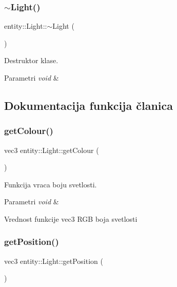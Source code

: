 \subsubsection{\texorpdfstring{$\sim$\+Light()}{~Light()}}
{\footnotesize\ttfamily entity\+::\+Light\+::$\sim$\+Light (\begin{DoxyParamCaption}{ }\end{DoxyParamCaption})}



Destruktor klase. 


\begin{DoxyParams}{Parametri}
{\em void} & \\
\hline
\end{DoxyParams}


\subsection{Dokumentacija funkcija članica}
\mbox{\label{classentity_1_1Light_a84799bc558b5c06758cd5e343243df4b}} 
\subsubsection{\texorpdfstring{get\+Colour()}{getColour()}}
{\footnotesize\ttfamily vec3 entity\+::\+Light\+::get\+Colour (\begin{DoxyParamCaption}{ }\end{DoxyParamCaption})}



Funkcija vraca boju svetlosti. 


\begin{DoxyParams}{Parametri}
{\em void} & \\
\hline
\end{DoxyParams}
\begin{DoxyReturn}{Vrednost funkcije}
vec3 R\+GB boja svetlosti 
\end{DoxyReturn}
\mbox{\label{classentity_1_1Light_aca0644bed009e20c672224ed0c92546e}} 
\subsubsection{\texorpdfstring{get\+Position()}{getPosition()}}
{\footnotesize\ttfamily vec3 entity\+::\+Light\+::get\+Position (\begin{DoxyParamCaption}{ }\end{DoxyParamCaption})}



